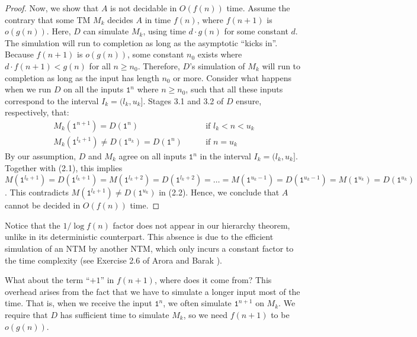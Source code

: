 \documentclass[11pt,twoside=off,numbers=noenddot]{scrbook}
\begin{document}
\begin{proof}
  Now, we show that $A$ is not decidable in $O(f(n))$ time. Assume the contrary that some TM $M_k$ decides $A$ in time $f(n)$, where $f(n + 1)$ is $o(g(n))$. Here, $D$ can simulate $M_k$, using time $d \cdot g(n)$ for some constant $d$. The simulation will run to completion as long as the asymptotic ``kicks in''. Because $f(n + 1)$ is $o(g(n))$, some constant $n_0$ exists where $d \cdot f(n + 1) < g(n)$ for all $n \geq n_0$. Therefore, $D$'s simulation of $M_k$ will run to completion as long as the input has length $n_0$ or more. Consider what happens when we run $D$ on all the inputs $\texttt{1}^n$ where $n \geq n_0$, such that all these inputs correspond to the interval $I_k = (l_k, u_k]$. Stages 3.1 and 3.2 of $D$ ensure, respectively, that:
  \begin{align}
    \text{$M_k(\texttt{1}^{n + 1}) = D(\texttt{1}^n)$} & \qquad \text{if $l_k < n < u_k$} \\
    \text{$M_k(\texttt{1}^{l_k + 1}) \neq D(\texttt{1}^{u_k}) = D(\texttt{1}^n)$} & \qquad \text{if $n = u_k$}
  \end{align}
  By our assumption, $D$ and $M_k$ agree on all inputs $\texttt{1}^n$ in the interval $I_k = (l_k, u_k]$. Together with (2.1), this implies $M(\texttt{1}^{l_k + 1}) = D(\texttt{1}^{l_k + 1}) = M(\texttt{1}^{l_k + 2}) = D(\texttt{1}^{l_k + 2}) = \dots = M(\texttt{1}^{u_k - 1}) = D(\texttt{1}^{u_k - 1}) = M(\texttt{1}^{u_k}) = D(\texttt{1}^{u_k})$. This contradicts $M(\texttt{1}^{l_k + 1}) \neq D(\texttt{1}^{u_k})$ in (2.2). Hence, we conclude that $A$ cannot be decided in $O(f(n))$ time.
\end{proof}

\begin{remark}
  Notice that the $1 / \log f(n)$ factor does not appear in our hierarchy theorem, unlike in its deterministic counterpart. This absence is due to the efficient simulation of an NTM by another NTM, which only incurs a constant factor to the time complexity (see Exercise 2.6 of Arora and Barak \cite{arora2009computational}).
\end{remark}

\begin{remark}
  What about the term ``$+ 1$'' in $f(n + 1)$, where does it come from? This overhead arises from the fact that we have to simulate a longer input most of the time. That is, when we receive the input $\texttt{1}^{n}$, we often simulate $\texttt{1}^{n + 1}$ on $M_k$. We require that $D$ has sufficient time to simulate $M_k$, so we need $f(n + 1)$ to be $o(g(n))$.
\end{remark}
\end{document}
